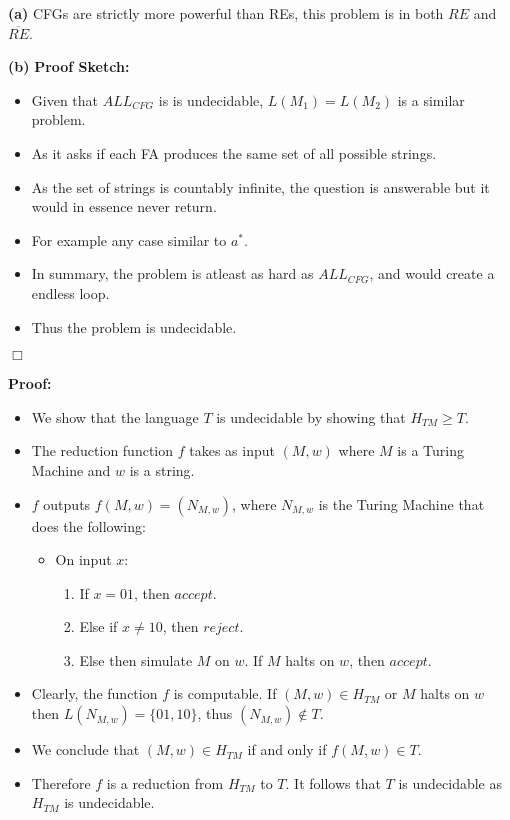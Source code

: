 \documentclass[11pt]{article}
\newcommand{\question}[2] {\vspace{.25in} \fbox{#1} #2 \vspace{.10in}}
\renewcommand{\part}[1] {\vspace{.10in} {\bf (#1)}}
\begin{document}
\part{a} CFGs are strictly more powerful than REs, this problem is in both $RE$ and $\overline{RE}$.

\part{b} \textbf{Proof Sketch:} 
\begin{itemize}
  \item Given that $ALL_{CFG}$ is is undecidable, $L(M_1) = L(M_2)$ is a similar problem.
  \item As it asks if each FA produces the same set of all possible strings. 
  \item As the set of strings is countably infinite, the question is answerable but it would in essence never return.
  \item For example any case similar to $a^*$. 
  \item In summary, the problem is atleast as hard as $ALL_{CFG}$, and would create a endless loop. 
  \item Thus the problem is undecidable.
\end{itemize}
\indent \indent $\Box$

\pagebreak
\question{6}{\textbf{Proof:}}

\begin{itemize}
\item We show that the language $T$ is undecidable by showing that $H_{TM} \geq T$. 
\item The reduction function $f$ takes as input $(M,w)$ where $M$ is a Turing Machine and $w$ is a string. 
\item $f$ outputs $f(M,w) = (N_{M,w})$, where $N_{M,w}$ is the Turing Machine that does the following:

 \begin{center}
  \begin{itemize}
    \item On input $x$:
    \begin{enumerate}
     \item If $x = 01$, then $accept$.
     \item Else if $x \not = 10$, then $reject$.
     \item Else then simulate $M$ on $w$. If $M$ halts on $w$, then $accept$.
    \end{enumerate}
  \end{itemize}
 \end{center}

\item Clearly, the function $f$ is computable. If $(M,w) \in H_{TM}$ or $M$ halts on $w$ then $L(N_{M,w}) = \{01,10\}$, thus $(N_{M,w}) \notin T$. 
\item We conclude that $(M,w) \in H_{TM}$ if and only if $f(M,w) \in T$. 
\item Therefore $f$ is a reduction from $H_{TM}$ to $T$. It follows that $T$ is undecidable as $H_{TM}$ is undecidable.
\end{itemize}
\end{document}

